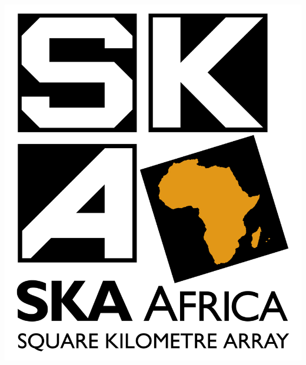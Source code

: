 \documentclass[a0,portrait]{a0poster}
\begin{document}
\begin{multicols}{2}

\nocite{*} %

\begin{center}\vspace{1cm}
\includegraphics[width=0.35\linewidth]{ska_logo.jpg}
\end{center}\vspace{1cm}


% 


\end{multicols}
\end{document}
